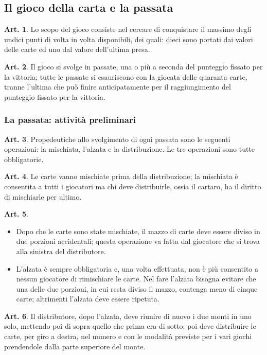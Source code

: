 \documentclass[italian,a4paper]{book}
\theoremstyle{definition}
\newtheorem{art}{Art.}
\newenvironment{packeditem}{
\begin{itemize}
  \setlength{\itemsep}{1pt}
  \setlength{\parskip}{0pt}
  \setlength{\parsep}{0pt}
}{\end{itemize}}
\begin{document}
\subsection{Il gioco della carta e la passata}
\begin{art}
    Lo scopo del gioco consiste nel cercare di conquistare il massimo degli undici punti di volta in volta disponibili, dei quali: dieci sono  portati dai valori delle carte ed uno dal valore dell'ultima presa.
\end{art}
\begin{art}
    Il gioco si svolge in passate, una o più a seconda del punteggio fissato per la vittoria; tutte le passate si esauriscono con la giocata delle quaranta carte, tranne l'ultima che può finire anticipatamente per il raggiungimento del punteggio fissato per la vittoria.
\end{art}
\subsubsection{La passata: attività preliminari}
\begin{art}\label{passata.iniz}
    Propedeutiche allo svolgimento di ogni passata sono le seguenti operazioni: la mischiata, l'alzata e la distribuzione.
    Le tre operazioni sono tutte obbligatorie.
\end{art}
\begin{art}
    Le carte vanno mischiate prima della distribuzione; la mischiata è consentita a tutti i giocatori ma chi deve distribuirle, ossia il cartaro, ha il diritto di mischiarle per ultimo.
\end{art}
\begin{art} \hspace*{\fill}
    \begin{packeditem}
\item Dopo che le carte sono state mischiate, il mazzo di carte deve essere diviso in due porzioni accidentali; questa operazione va fatta dal giocatore che si trova alla sinistra del distributore.
\item L'alzata è sempre obbligatoria e, una volta effettuata, non è più consentito a nessun giocatore di rimischiare le carte. Nel fare l'alzata bisogna evitare che una delle due porzioni, in cui resta diviso il mazzo, contenga meno di cinque carte; altrimenti l'alzata deve essere ripetuta.
    \end{packeditem}
\end{art}
\begin{art}
    Il distributore, dopo l'alzata, deve riunire di nuovo i due monti in uno solo, mettendo poi di sopra quello che prima era di sotto; poi deve distribuire le carte, per giro a destra, nel numero e con le modalità previste per i vari giochi prendendole dalla parte superiore del monte.
\end{art}
\end{document}
